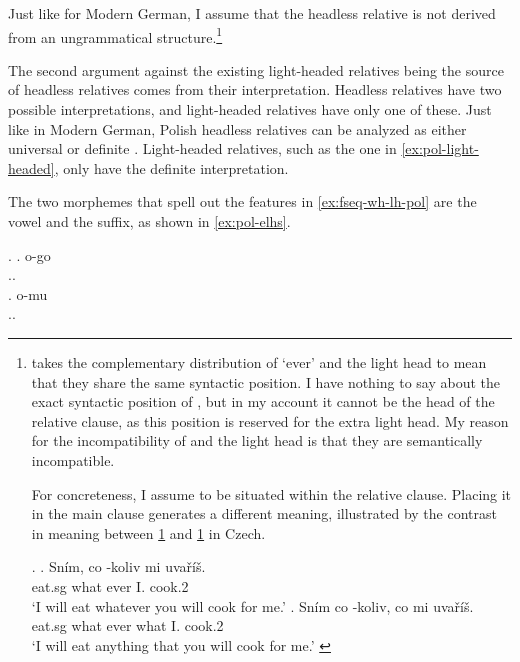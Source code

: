 Just like for Modern German, I assume that the headless relative is not derived from an ungrammatical structure.\footnote{
\citet{citko2004} takes the complementary distribution of  `ever' and the light head to mean that they share the same syntactic position. I have nothing to say about the exact syntactic position of , but in my account it cannot be the head of the relative clause, as this position is reserved for the extra light head. My reason for the incompatibility of  and the light head is that they are semantically incompatible.

For concreteness, I assume  to be situated within the relative clause. Placing it in the main clause generates a different meaning, illustrated by the contrast in meaning between \ref{ex:cz-wh-ever} and \ref{ex:cz-ever-wh} in Czech.

\ex.
\ag. Sním, co -koliv mi uvaříš.\\
 eat.sg what ever I. cook.2\\
 `I will eat whatever you will cook for me.'\label{ex:cz-wh-ever}
\bg. Sním co -koliv, co mi uvaříš.\\
 eat.sg what ever what I. cook.2\\
 `I will eat anything that you will cook for me.' \label{ex:cz-ever-wh}

\phantom{x}
}

The second argument against the existing light-headed relatives being the source of headless relatives comes from their interpretation. Headless relatives have two possible interpretations, and light-headed relatives have only one of these.
Just like in Modern German, Polish headless relatives can be analyzed as either universal or definite .
Light-headed relatives, such as the one in \ref{ex:pol-light-headed}, only have the definite interpretation.






The two morphemes that spell out the features in \ref{ex:fseq-wh-lh-pol} are the vowel and the suffix, as shown in \ref{ex:pol-elhs}.

\ex.\label{ex:pol-elhs}
\ag. o-go\\
 ..\\
\bg. o-mu\\
 ..\\

